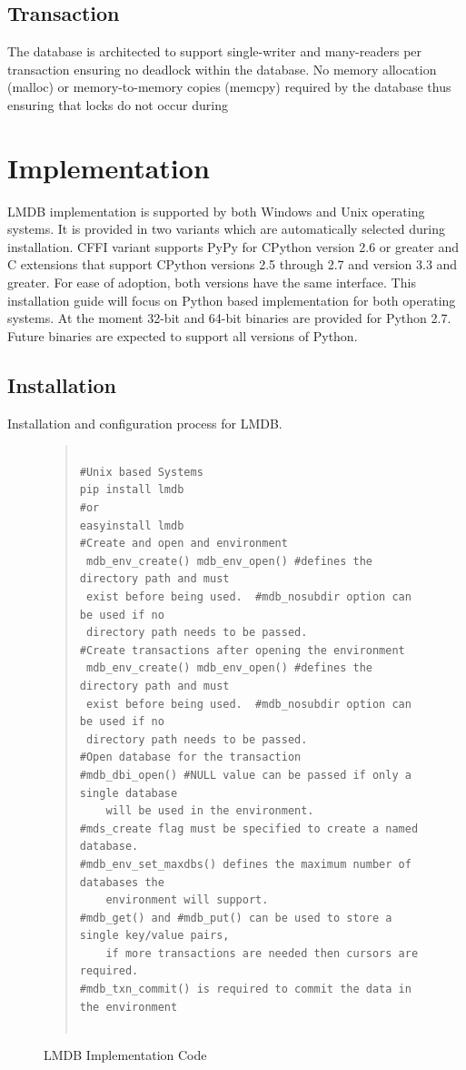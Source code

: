 \documentclass[9pt,twocolumn,twoside]{../../styles/osajnl}
\begin{document}

\subsection{Transaction}

The database is architected to support single-writer and many-readers
per transaction \cite{www-lmdbdoc} ensuring no deadlock within the
database. No memory allocation (malloc) or memory-to-memory copies
(memcpy) required by the database thus ensuring that locks do not
occur during

\section{Implementation}

LMDB implementation is supported by both Windows and Unix operating
systems. It is provided in two variants which are automatically
selected during installation. CFFI variant supports PyPy for CPython
version 2.6 or greater and C extensions that support CPython versions
2.5 through 2.7 and version 3.3 and greater. For ease of adoption,
both versions have the same interface. This installation guide will
focus on Python based implementation for both operating systems.  At
the moment 32-bit and 64-bit binaries are provided for Python
2.7. Future binaries are expected to support all versions of Python.

\subsection{Installation}

Installation and configuration process for LMDB.

\begin{figure}[htb]
\begin{quote}
\begin{Verbatim}

#Unix based Systems
pip install lmdb
#or
easyinstall lmdb
#Create and open and environment   
 mdb_env_create() mdb_env_open() #defines the directory path and must
 exist before being used.  #mdb_nosubdir option can be used if no
 directory path needs to be passed. 
#Create transactions after opening the environment
 mdb_env_create() mdb_env_open() #defines the directory path and must
 exist before being used.  #mdb_nosubdir option can be used if no
 directory path needs to be passed. 
#Open database for the transaction
#mdb_dbi_open() #NULL value can be passed if only a single database
    will be used in the environment. 
#mds_create flag must be specified to create a named database. 
#mdb_env_set_maxdbs() defines the maximum number of databases the
    environment will support.
#mdb_get() and #mdb_put() can be used to store a single key/value pairs,
    if more transactions are needed then cursors are required. 
#mdb_txn_commit() is required to commit the data in the environment


\end{Verbatim}
\end{quote}
\caption{LMDB Implementation Code}\label{alg:python}
\end{figure}
\end{document}
